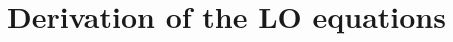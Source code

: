 \documentclass[xcolor=dvipsnames,hyperref={pdfpagelabels=false},unknownkeysallowed]{beamer}
\newcommand{\keff}[0]{\ensuremath{{k}_{\textsf{eff}}} }
\newcommand{\B}[1]{\ensuremath{\mathbf{#1}}}
\begin{document}





\section{Derivation of the LO equations}
\subsection{}
\end{document}
